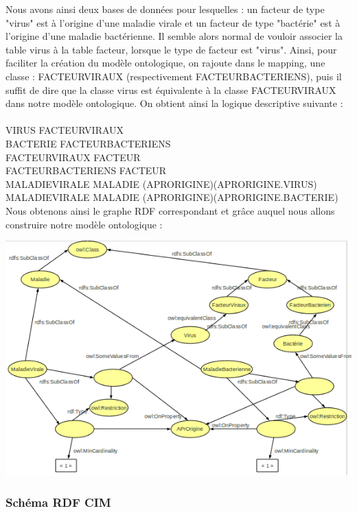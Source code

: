 \documentclass[12pt]{article}
\begin{document}
\indent Nous avons ainsi deux bases de données pour lesquelles : un facteur de type "virus" est à l'origine d'une maladie virale et un facteur de type "bactérie" est à l'origine d'une maladie bactérienne. Il semble alors normal de vouloir associer la table virus à la table facteur, lorsque le type de facteur est "virus". Ainsi, pour faciliter la création du modèle ontologique, on rajoute dans le mapping, une classe : FACTEURVIRAUX (respectivement FACTEURBACTERIENS), puis il suffit de dire que la classe virus est équivalente à la classe FACTEURVIRAUX dans notre modèle ontologique. On obtient ainsi la logique descriptive suivante : 
\\
\\
	VIRUS \subseteq FACTEURVIRAUX \\
	BACTERIE \subseteq FACTEURBACTERIENS \\
	FACTEURVIRAUX \subseteq FACTEUR \\
	FACTEURBACTERIENS \subseteq FACTEUR \\ 
	MALADIEVIRALE \subseteq MALADIE \cap (\geq APRORIGINE)(\exists APRORIGINE.VIRUS) \\
 	MALADIEVIRALE \subseteq MALADIE \cap (\geq APRORIGINE)(\exists APRORIGINE.BACTERIE) \\

\indent Nous obtenons ainsi le graphe RDF correspondant et grâce auquel nous allons construire notre modèle ontologique :

\begin{center}
	\includegraphics[scale=0.70]{rdf/rdf-schema.png}
\end{center}

\subsubsection{Schéma RDF CIM}
\end{document}
